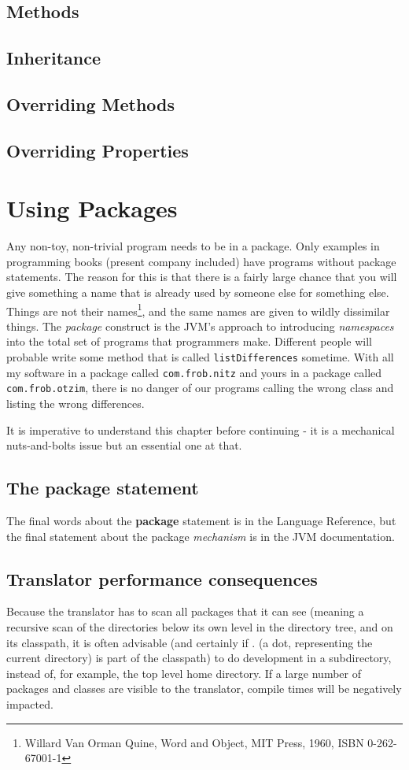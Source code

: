 \section{Methods}
\section{Inheritance}
\section{Overriding Methods}
\section{Overriding Properties}
\chapter{Using Packages}
Any non-toy, non-trivial program needs to be in a package. Only
examples in programming books (present company included) have programs
without package statements. The reason
for this is that there is a fairly large chance that you will give
something a name that is already used by someone else for something
else. Things are not their names\footnote{Willard Van Orman Quine, Word
  and Object, MIT Press, 1960, ISBN 0-262-67001-1}, and the same names
are given to wildly dissimilar things. The \emph{package} construct is the JVM's approach to
introducing \emph{namespaces} into the total set of programs that
programmers make. Different people will probable write some method that is
called \texttt{listDifferences} sometime. With all my software in a
package called \texttt{com.frob.nitz} and yours in a package
called \texttt{com.frob.otzim}, there is no danger of our programs
calling the wrong class and listing the wrong differences.

It is imperative to understand this chapter before continuing - it is
a mechanical nuts-and-bolts issue but an essential one at that.

\section{The package statement}
The final words about the \nr{} \textbf{package} statement is in the
\nr{} Language Reference, but the final statement about the package
\emph{mechanism} is in the JVM documentation.
\section{Translator performance consequences}
Because the \nr{} translator has to scan all packages that it can
see (meaning a recursive scan of the directories below its own level
in the directory tree, and on its classpath, it is often advisable
(and certainly if . (a dot, representing the current directory) is part of the classpath)
to do development in a subdirectory, instead of, for example, the top
level home directory. If a large number of packages and classes are
visible to the translator, compile times will be negatively impacted. 


